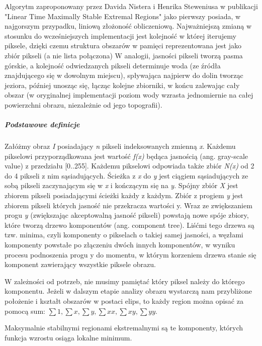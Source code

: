 Algorytm zaproponowany przez Davida Nistera i Henrika Steweniusa w publikacji
"Linear Time Maximally Stable Extremal Regions" jako pierwszy posiada, w
najgorszym przypadku, liniową złożoność obliczeniową. Najważniejszą zmianą w
stosunku do wcześniejszych implementacji jest kolejność w której iterujemy
piksele, dzięki czemu struktura obszarów w pamięci reprezentowana jest jako
zbiór pikseli (a nie lista połączona) W analogii, jasności pikseli tworzą pasma
górskie, a kolejność odwiedzanych pikseli determinuje woda (ze źródła
znajdującego się w dowolnym miejscu), spływająca najpierw do dolin tworząc
jeziora, później unosząc się, łącząc kolejne zbiorniki, w końcu zalewając cały
obszar (w oryginalnej implementacji poziom wody wzrasta jednomiernie na całej
powierzchni obrazu, niezależnie od jego topografii).

\subparagraph{Podstawowe definicje}

Załóżmy obraz \textit{I} posiadający \textit{n} pikseli indeksowanych zmienną
\textit{x}. Każdemu pikselowi przyporządkowana jest wartość \textit{f(x)}
będąca jasnością (ang. gray-scale value) z przedziału [0..255]. Każdemu
pikselowi odpowiada także zbiór \textit{N(x)} od 2 do 4 pikseli z nim
sąsiadujących. Ścieżka z \textit{x} do \textit{y} jest ciągiem sąsiadujących ze
sobą pikseli zaczynającym się w \textit{x} i kończącym się na \textit{y}.
Spójny zbiór \textit{X} jest zbiorem pikseli posiadającymi ścieżki każdy z
każdym. Zbiór z progiem \textit{y} jest zbiorem pikseli których jasność nie
przekracza wartości y. Wraz ze zwiększaniem progu \textit{y} (zwiększając
akceptowalną jasność pikseli) powstają nowe spóje zbiory, które tworzą drzewo
komponentów (ang. component tree). Liśćmi tego drzewa są tzw. minima, czyli
komponenty o pikselach o takiej samej jasności, a węzłami komponenty powstałe
po złączeniu dwóch innych komponentów, w wyniku procesu podnoszenia progu y do
momentu, w którym korzeniem drzewa stanie się komponent zawierający wszystkie
piksele obrazu.

W zależności od potrzeb, nie musimy pamiętać który piksel należy do którego
komponentu. Jeżeli w dalszym etapie analizy obrazu wystarczą nam przybliżone
położenie i kształt obszarów w postaci elips, to każdy region można opisać za
pomocą sum: $\sum{1}, \sum{x}, \sum{y}, \sum{xx}, \sum{xy}, \sum{yy}$.

Maksymalnie stabilnymi regionami ekstremalnymi są te komponenty, których funkcja
wzrostu osiąga lokalne minimum.  

